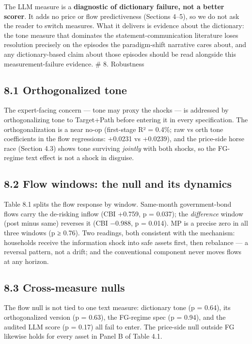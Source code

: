 The LLM measure is a \textbf{diagnostic of dictionary failure, not a better scorer}. It adds no price or flow predictiveness (Sections 4--5), so we do not ask the reader to switch measures. What it delivers is evidence about the dictionary: the tone measure that dominates the statement-communication literature loses resolution precisely on the episodes the paradigm-shift narrative cares about, and any dictionary-based claim about those episodes should be read alongside this measurement-failure evidence. \# 8. Robustness

\subsection{8.1 Orthogonalized tone}\label{orthogonalized-tone}

The expert-facing concern --- tone may proxy the shocks --- is addressed by orthogonalizing tone to Target+Path before entering it in every specification. The orthogonalization is a near no-op (first-stage R² = 0.4\%; raw vs orth tone coefficients in the flow regressions: +0.0231 vs +0.0239), and the price-side horse race (Section 4.3) shows tone surviving \emph{jointly} with both shocks, so the FG-regime text effect is not a shock in disguise.

\subsection{8.2 Flow windows: the null and its dynamics}\label{flow-windows-the-null-and-its-dynamics}

Table 8.1 splits the flow response by window. Same-month government-bond flows carry the de-risking inflow (CBI +0.759, p = 0.037); the \emph{difference} window (post minus same) reverses it (CBI −0.988, p = 0.014). MP is a precise zero in all three windows (p ≥ 0.76). Two readings, both consistent with the mechanism: households receive the information shock into safe assets first, then rebalance --- a reversal pattern, not a drift; and the conventional component never moves flows at any horizon.



\subsection{8.3 Cross-measure nulls}\label{cross-measure-nulls}

The flow null is not tied to one text measure: dictionary tone (p = 0.64), its orthogonalized version (p = 0.63), the FG-regime spec (p = 0.94), and the audited LLM score (p = 0.17) all fail to enter. The price-side null outside FG likewise holds for every asset in Panel B of Table 4.1.

